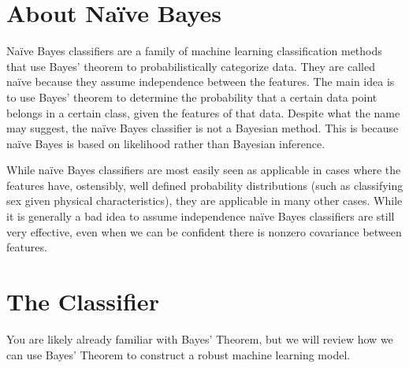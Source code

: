 

\section*{About Naïve Bayes}
Naïve Bayes classifiers are a family of machine learning classification methods that use Bayes' theorem to probabilistically categorize data.
They are called naïve because they assume independence between the features.
The main idea is to use Bayes' theorem to determine the probability that a certain data point belongs in a certain class, given the features of that data.
Despite what the name may suggest, the naïve Bayes classifier is not a Bayesian method.
This is because naïve Bayes is based on likelihood rather than Bayesian inference.

While naïve Bayes classifiers are most easily seen as applicable in cases where the features have, ostensibly, well defined probability distributions (such as classifying sex given physical characteristics), they are applicable in many other cases.
While it is generally a bad idea to assume independence naïve Bayes classifiers are still very effective, even when we can be confident there is nonzero covariance between features.



\section*{The Classifier}
You are likely already familiar with Bayes' Theorem, but we will review how we can use Bayes' Theorem to construct a robust machine learning model.

